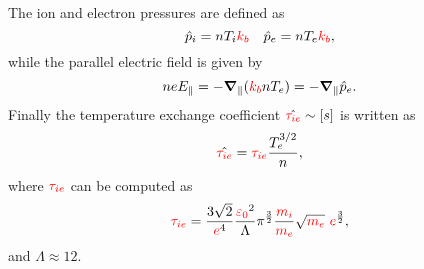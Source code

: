 \documentclass[a4paper,10pt]{article}
\newcommand{\bm}[1]{\text{\boldmath$#1$\unboldmath}}
\newcommand{\Grad}{\bm{\nabla}}
\newcommand{\Gradpar}{\Grad_{\parallel}}
\newcommand{\yd}[1]{{\color{red} #1\color{black}}} %
\def\kb{\yd{k_b}}
\def\mi{\yd{m_i}}
\def\e{\yd{e}}
\def\me{\yd{m_e}}
\def\epsz{\yd{\varepsilon_0}}
\def\tie{\yd{\tau_{ie}}}
\begin{document}
The ion and electron pressures are defined as 
\begin{equation}
 \hat{p}_i = n T_i \kb \quad \hat{p}_e= nT_e \kb,
\end{equation}
while the parallel electric field is given by
\begin{equation}
 n e E_{\parallel} = -\Gradpar (\kb n T_e) = -\Gradpar \hat{p}_e.
\end{equation}
Finally the temperature exchange coefficient $\hat{\tie}\sim [s]$ is written as
\begin{equation}
 \hat{\tie} = \tie \frac{T_e^{3/2}}{n},
\end{equation}
where $\tie$ can be computed as
\begin{equation}
 \tie = \frac{3\sqrt{2}}{\e^4} \frac{\epsz^2}{\Lambda} \pi^{\frac{3}{2}}\frac{\mi}{\me}\sqrt{\me} \ \e^{\frac{3}{2}},
\end{equation}
and $\Lambda\approx 12$.
\end{document}
